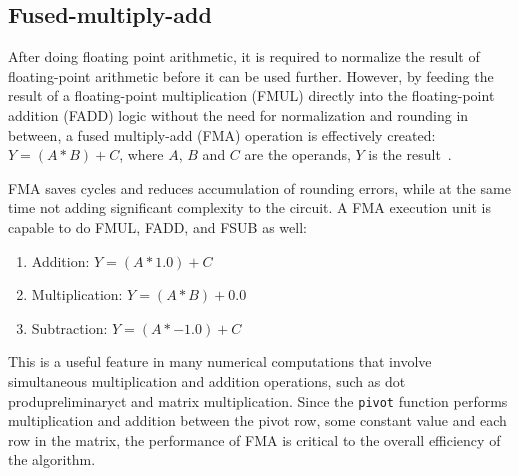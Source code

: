 \documentclass[logo,bsc,singlespacing,parskip]{infthesis}
\newcommand{\pivot}{\texttt{pivot}}
\newenvironment{compactlist}
{ \begin{enumerate}
    \setlength{\itemsep}{0pt}
    \setlength{\parskip}{0pt}
    \setlength{\parsep}{0pt}     
}
{ \end{enumerate} }
\begin{document}
\subsection{Fused-multiply-add}
\label{sec:FMA}

After doing floating point arithmetic, it is required to normalize the result of
floating-point arithmetic before it can be used further. However, by feeding the
result of a floating-point multiplication (FMUL) directly into the
floating-point addition (FADD) logic without the need for normalization and
rounding in between, a fused multiply-add (FMA) operation is effectively
created: 
\begin{math}Y = (A * B) + C \end{math}, where 
\begin{math}A\end{math},
\begin{math}B\end{math} and
\begin{math}C\end{math} are the operands, 
\begin{math}Y\end{math} is the result~\cite{CARD}.

FMA saves cycles and reduces accumulation of rounding errors, while at the same
time not adding significant complexity to the circuit. A FMA execution unit is
capable to do FMUL, FADD, and FSUB as well: 
\begin{compactlist} 
\item[] Addition: \begin{math}Y = (A * 1.0) + C \end{math} 
\item[] Multiplication: \begin{math} Y = (A * B) + 0.0 \end{math} 
\item[] Subtraction: \begin{math} Y = (A * -1.0) + C\end{math} 
\end{compactlist} 

This is a useful feature in many numerical computations that involve
simultaneous multiplication and addition operations, such as dot produpreliminaryct and
matrix multiplication. Since the \pivot{} function performs multiplication and
addition between the pivot row, some constant value and each row in the matrix,
the performance of FMA is critical to the overall efficiency of the algorithm. 
\end{document}
